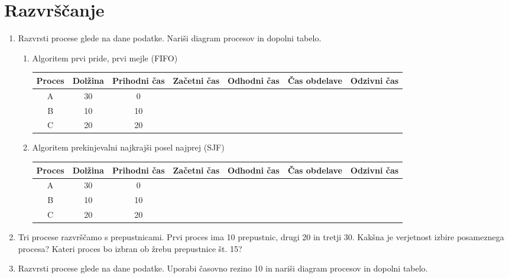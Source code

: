 \documentclass{book}
\begin{document}
\section{Razvrščanje}
\begin{enumerate}
    \item Razvrsti procese glede na dane podatke. Nariši diagram procesov in dopolni tabelo.
        \begin{enumerate}
            \item Algoritem prvi pride, prvi mejle (FIFO) \\
                \begin{tabular}{|c|c|c|c|c|c|c|}
                    \hline
                    Proces & Dolžina & Prihodni čas & Začetni čas & Odhodni čas & Čas obdelave & Odzivni čas \\
                    \hline
                    A & 30 & 0 & & & & \\
                    \hline
                    B & 10 & 10 & & & & \\
                    \hline
                    C & 20 & 20 & & & & \\
                    \hline
                \end{tabular}
            \item Algoritem prekinjevalni najkrajši posel najprej (SJF) \\
                \begin{tabular}{|c|c|c|c|c|c|c|}
                    \hline
                    Proces & Dolžina & Prihodni čas & Začetni čas & Odhodni čas & Čas obdelave & Odzivni čas \\
                    \hline
                    A & 30 & 0 & & & & \\
                    \hline
                    B & 10 & 10 & & & & \\
                    \hline
                    C & 20 & 20 & & & & \\
                    \hline
                \end{tabular}
        \end{enumerate}
    \item Tri procese razvrščamo s prepustnicami. Prvi proces ima 10 prepustnic, drugi 20 in tretji 30. Kakšna je verjetnost izbire posameznega procesa? Kateri proces bo izbran ob žrebu prepustnice št. 15?
    \item Razvrsti procese glede na dane podatke. Uporabi časovno rezino 10 in nariši diagram procesov in dopolni tabelo.
        \begin{enumerate}

\end{enumerate}
\end{enumerate}
\end{document}
